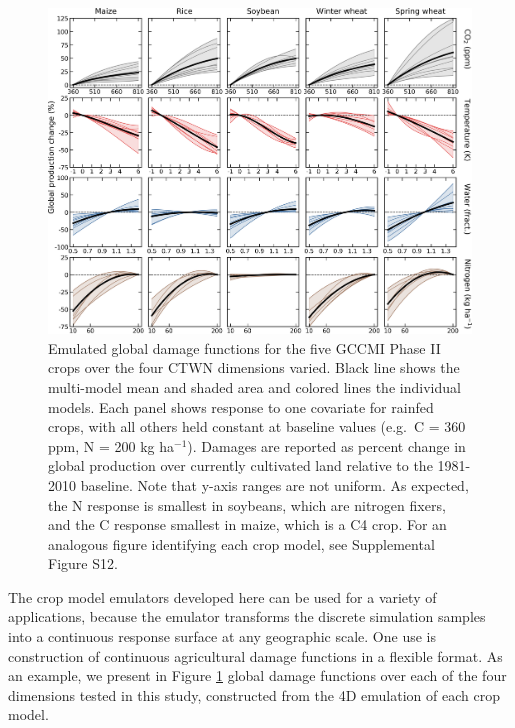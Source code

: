 \documentclass[gmd, manuscript]{copernicus} %
\begin{document}
\begin{figure}[h!]
  \centering
  \includegraphics[width = 16.3cm]{figures/em_CTWN_all_crops.png}
  \caption{
  Emulated global damage functions for the five GCCMI Phase II crops over the four CTWN dimensions varied. %
  Black line shows the multi-model mean and shaded area and colored lines the individual models. 
  Each panel shows response to one covariate for rainfed crops, with all others held constant at baseline values (e.g.\ C = 360 ppm, N = 200 kg ha$^{-1}$). 
  Damages are reported as percent change in global production over currently cultivated land relative to the 1981-2010 baseline. Note that y-axis ranges are not uniform.
  As expected, the N response is smallest in soybeans, which are nitrogen fixers, and the C response smallest in maize, which is a C4 crop. %
  For an analogous figure identifying each crop model, see Supplemental Figure S12.
  }
  \label{fig:all_dims}
\end{figure}

The crop model emulators developed here can be used for a variety of applications, because the emulator transforms the discrete simulation samples into a continuous response surface at any geographic scale. One use is construction of continuous agricultural damage functions in a flexible format. 
As an example, we present in  Figure \ref{fig:all_dims} global damage functions over each of the four dimensions tested in this study, constructed from the 4D emulation of each crop model. %
\end{document}
